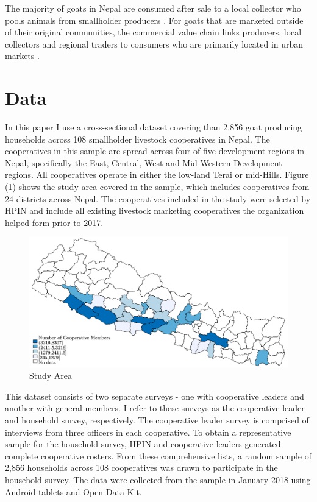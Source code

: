 \documentclass[11pt]{article}
\begin{document}
The majority of goats in Nepal are consumed after sale to a local collector who pools animals from smallholder producers \citep{heifer_international_nepal_study_2012}. For goats that are marketed outside of their original communities, the commercial value chain links producers, local collectors and regional traders to consumers who are primarily located in urban markets \citep{heifer_international_nepal_study_2012}. 


\section{Data} \label{sec:data}
In this paper I use a cross-sectional dataset covering than 2,856 goat producing households across 108 smallholder livestock cooperatives in Nepal. The cooperatives in this sample are spread across four of five development regions in Nepal, specifically the East, Central, West and Mid-Western Development regions. All cooperatives operate in either the low-land Terai or mid-Hills. Figure (\ref{map}) shows the study area covered in the sample, which includes cooperatives from 24 districts across Nepal. The cooperatives included in the study were selected by HPIN and include all existing livestock marketing cooperatives the organization helped form prior to 2017.

\begin{figure}[!h]
    \caption{Study Area}
    \label{map}
    \noindent \centering \includegraphics[width=.9\textwidth,trim=4 4 4 4,clip]{StudyMap.png}
\end{figure}

This dataset consists of two separate surveys - one with cooperative leaders and another with general members.  %
I refer to these surveys as the cooperative leader and household survey, respectively. The cooperative leader survey is comprised of interviews from three officers in each cooperative. To obtain a representative sample for the household survey, HPIN and cooperative leaders generated complete cooperative rosters. From these comprehensive lists, a random sample of 2,856 households across 108 %
cooperatives was drawn to participate in the household survey. The data were collected from the sample in January 2018 using Android tablets and Open Data Kit.
\end{document}
